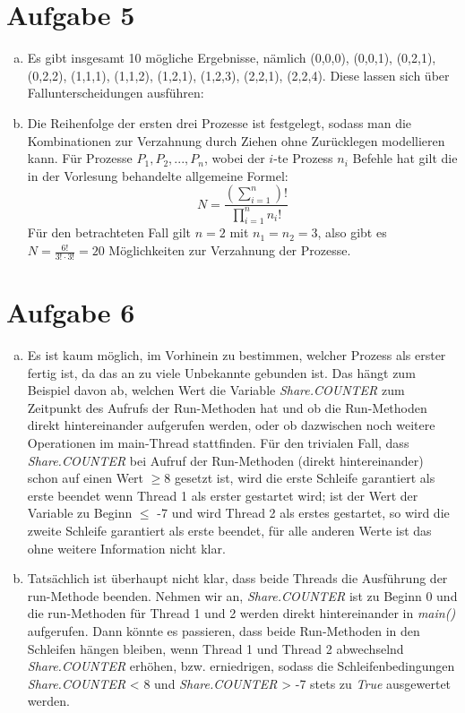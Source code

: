 \documentclass[numbers=noendperiod]{scrartcl}
\begin{document}
\section*{Aufgabe 5}
\begin{enumerate}[a)]
	\item Es gibt insgesamt 10 mögliche Ergebnisse, nämlich (0,0,0), (0,0,1), (0,2,1), (0,2,2), (1,1,1), (1,1,2), (1,2,1), (1,2,3), (2,2,1), (2,2,4). Diese lassen sich über Fallunterscheidungen ausführen:
	
	\item Die Reihenfolge der ersten drei Prozesse ist festgelegt, sodass man die Kombinationen zur Verzahnung durch Ziehen ohne Zurücklegen modellieren kann. Für Prozesse $P_1, P_2, ..., P_n$, wobei der $i$-te Prozess $n_i$ Befehle hat gilt die in der Vorlesung behandelte allgemeine Formel:
	\begin{equation}
		N = \frac{\left(\sum_{i=1}^{n}\right)!}{\prod_{i=1}^{n}n_i!}
	\end{equation}
	Für den betrachteten Fall gilt $n=2$ mit $n_1 = n_2 = 3$, also gibt es $N = \frac{6!}{3!\cdot 3!} = 20$ Möglichkeiten zur Verzahnung der Prozesse.
\end{enumerate}



\section*{Aufgabe 6}
\begin{enumerate}[a)]
	\item Es ist kaum möglich, im Vorhinein zu bestimmen, welcher Prozess als erster fertig ist, da das an zu viele Unbekannte gebunden ist. Das hängt zum Beispiel davon ab, welchen Wert die Variable \textit{Share.COUNTER} zum Zeitpunkt des Aufrufs der Run-Methoden hat und ob die Run-Methoden direkt hintereinander aufgerufen werden, oder ob dazwischen noch weitere Operationen im main-Thread stattfinden. Für den trivialen Fall, dass \textit{Share.COUNTER} bei Aufruf der Run-Methoden (direkt hintereinander) schon auf einen Wert $\ge$8 gesetzt ist, wird die erste Schleife garantiert als erste beendet wenn Thread 1 als erster gestartet wird; ist der Wert der Variable zu Beginn $\le$ -7 und wird Thread 2 als erstes gestartet, so wird die zweite Schleife garantiert als erste beendet, für alle anderen Werte ist das ohne weitere Information nicht klar.
	
	\item Tatsächlich ist überhaupt nicht klar, dass beide Threads die Ausführung der run-Methode beenden. Nehmen wir an, \textit{Share.COUNTER} ist zu Beginn 0 und die run-Methoden für Thread 1 und 2 werden direkt hintereinander in \textit{main()} aufgerufen. Dann könnte es passieren, dass beide Run-Methoden in den Schleifen hängen bleiben, wenn Thread 1 und Thread 2 abwechselnd \textit{Share.COUNTER} erhöhen, bzw. erniedrigen, sodass die Schleifenbedingungen \textit{Share.COUNTER} < 8 und \textit{Share.COUNTER} > -7 stets zu \textit{True} ausgewertet werden.
\end{enumerate}
\end{document}
